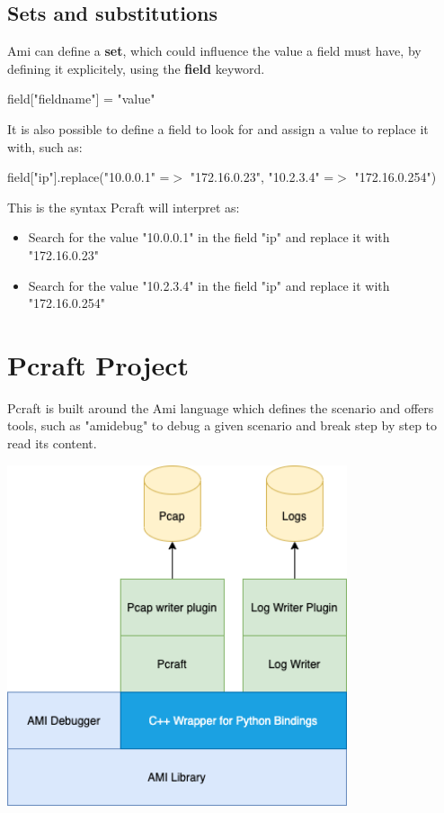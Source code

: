 \documentclass[10pt]{article}
\begin{document}
\subsection{Sets and substitutions}

Ami can define a \textbf{set}, which could influence the value a field must have, by defining it explicitely, using the \textbf{field} keyword.
\begin{center}
field["fieldname"] = "value"
\end{center}

It is also possible to define a field to look for and assign a value to replace it with, such as:
\begin{center}
  field["ip"].replace("10.0.0.1" =$>$ "172.16.0.23", "10.2.3.4" =$>$ "172.16.0.254")
\end{center}

This is the syntax Pcraft will interpret as:
\begin{itemize}
  \item Search for the value "10.0.0.1" in the field "ip" and replace it with "172.16.0.23"
  \item Search for the value "10.2.3.4" in the field "ip" and replace it with "172.16.0.254"
\end{itemize}


\section{Pcraft Project}

Pcraft is built around the Ami language which defines the scenario and offers tools, such as "amidebug" to debug a given scenario and break step by step to read its content.

\begin{center}
\includegraphics[width=10cm]{pcraft.png}
\end{center}
\end{document}
